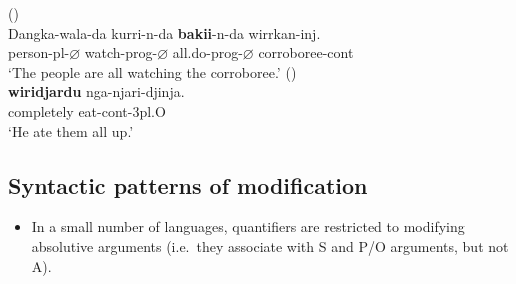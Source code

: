 \documentclass{article}
\begin{document}
\begin{exe}
 (\citealt[464]{round09})\\
\gll Dangka-wala-da kurri-n-da          \textbf{bakii}-n-da         wirrkan-inj. \\
person-{\sc pl}-$\varnothing$       watch-{\sc prog}-$\varnothing$ all.do-{\sc prog}-$\varnothing$ corroboree-{\sc cont}  \\
\glt `The people are all watching the corroboree.'
 (\citealt[54]{sands89})\\
\gll \textbf{wiridjardu}  nga-njari-djinja.\\
 completely  eat-{\sc cont}-3{\sc pl.O}     \\   
\glt `He ate them all up.'
\end{exe}



\subsection{Syntactic patterns of modification
\label{sec:scope}}
\begin{itemize}
\item In a small number of languages, quantifiers are restricted to modifying absolutive arguments (i.e.\ they associate with S and P/O arguments, but not A). %
\end{itemize}
\end{document}
